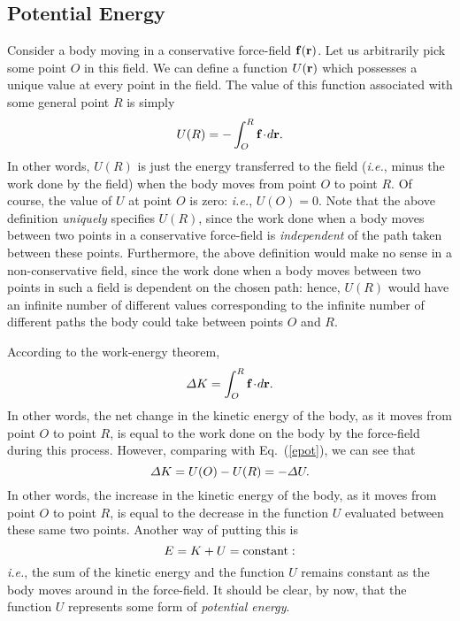 \subsection{Potential Energy}\label{spotn}
Consider a body moving in a conservative force-field ${\bf f}({\bf r})$. Let us
arbitrarily pick some point $O$ in this field. We can define a
function $U({\bf r})$ which possesses a unique value at every point in
the field. The value of this function associated with some
general point $R$ is simply
\begin{equation}\label{epot}
U(R) = -\int_O^R {\bf f}\!\cdot\!d{\bf r}.
\end{equation}
In other words, $U(R)$ is just the energy transferred to the field ({\em i.e.}, minus
the work done by the field) when the
body moves from point $O$ to point $R$. Of course, the value of $U$ at point
$O$ is zero: {\em i.e.}, $U(O)=0$. Note that the above definition {\em uniquely} specifies $U(R)$, since
the work done when a body moves between two points in a conservative
force-field is {\em independent} of the path taken between these points. Furthermore,
the above definition would make no sense in a non-conservative field, since
the work done when a body moves between two points in such a
field is dependent on the chosen path: hence, $U(R)$ would have an infinite number
of different values corresponding to the infinite number of different paths the body could take
between points $O$ and $R$.

According to the work-energy theorem,
\begin{equation}\label{ewe}
{\mit\Delta} K = \int_O^R {\bf f}\!\cdot\!d{\bf r}.
\end{equation}
In other words, the net change in the kinetic energy of the body, as it
moves from point $O$ to point $R$, is equal to the work done
on the body by the force-field during this process.
However, comparing with  Eq.~(\ref{epot}), we can see that
\begin{equation}
{\mit\Delta} K = U(O) - U(R) = -{\mit\Delta} U.
\end{equation}
In other words, the increase in the  kinetic energy of the body, as it moves
from point $O$ to point $R$, is equal to the decrease in the
function $U$ evaluated between these same two points. Another way
of putting this is
\begin{equation}
E = K + U = {\rm constant}:
\end{equation}
{\em i.e.}, the sum of the kinetic energy and the function $U$ remains
constant as the body moves around in the force-field. It should be clear, by now, that the
function $U$ represents some form of {\em potential energy}. 

